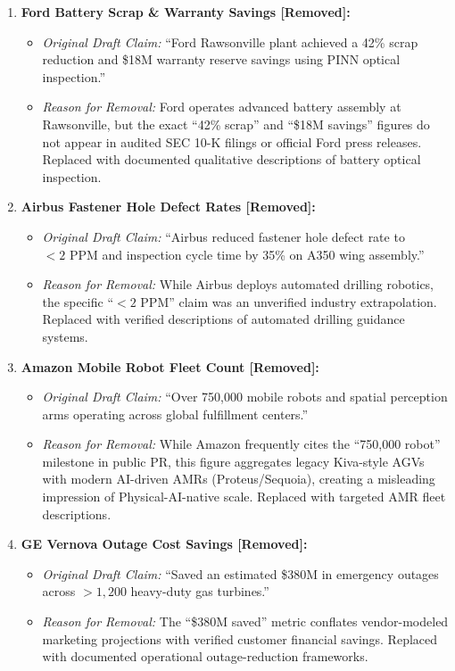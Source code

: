 \documentclass[11pt,a4paper]{article}
\begin{document}
\begin{enumerate}
    \item \textbf{Ford Battery Scrap \& Warranty Savings [Removed]:}
    \begin{itemize}
        \item \textit{Original Draft Claim:} ``Ford Rawsonville plant achieved a 42\% scrap reduction and \$18M warranty reserve savings using PINN optical inspection.''
        \item \textit{Reason for Removal:} Ford operates advanced battery assembly at Rawsonville, but the exact ``42\% scrap'' and ``\$18M savings'' figures do not appear in audited SEC 10-K filings or official Ford press releases. Replaced with documented qualitative descriptions of battery optical inspection.
    \end{itemize}

    \item \textbf{Airbus Fastener Hole Defect Rates [Removed]:}
    \begin{itemize}
        \item \textit{Original Draft Claim:} ``Airbus reduced fastener hole defect rate to $<2\text{ PPM}$ and inspection cycle time by 35\% on A350 wing assembly.''
        \item \textit{Reason for Removal:} While Airbus deploys automated drilling robotics, the specific ``$<2\text{ PPM}$'' claim was an unverified industry extrapolation. Replaced with verified descriptions of automated drilling guidance systems.
    \end{itemize}

    \item \textbf{Amazon Mobile Robot Fleet Count [Removed]:}
    \begin{itemize}
        \item \textit{Original Draft Claim:} ``Over 750,000 mobile robots and spatial perception arms operating across global fulfillment centers.''
        \item \textit{Reason for Removal:} While Amazon frequently cites the ``750,000 robot'' milestone in public PR, this figure aggregates legacy Kiva-style AGVs with modern AI-driven AMRs (Proteus/Sequoia), creating a misleading impression of Physical-AI-native scale. Replaced with targeted AMR fleet descriptions.
    \end{itemize}

    \item \textbf{GE Vernova Outage Cost Savings [Removed]:}
    \begin{itemize}
        \item \textit{Original Draft Claim:} ``Saved an estimated \$380M in emergency outages across $>1,200$ heavy-duty gas turbines.''
        \item \textit{Reason for Removal:} The ``\$380M saved'' metric conflates vendor-modeled marketing projections with verified customer financial savings. Replaced with documented operational outage-reduction frameworks.
    \end{itemize}


\end{enumerate}
\end{document}
